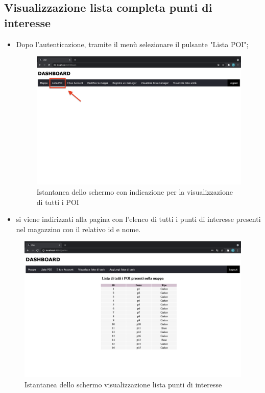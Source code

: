 \subsection{Visualizzazione lista completa punti di interesse}
\begin{itemize}
    \item Dopo l'autenticazione, tramite il menù selezionare il pulsante "Lista POI";
    \begin{figure}[H]
        \centering
        \includegraphics[scale=0.12]{res/images/dashboard2.png}
        \caption{Istantanea dello schermo con indicazione per la visualizzazione di tutti i POI}
    \end{figure}
    \item si viene indirizzati alla pagina con l'elenco di tutti i punti di interesse presenti nel magazzino con il relativo id e nome.

\end{itemize}

\begin{figure}[H]
    \centering
    \includegraphics[scale=0.12]{res/images/listpoi_user.png}
    \caption{Istantanea dello schermo visualizzazione lista punti di interesse}
\end{figure}


